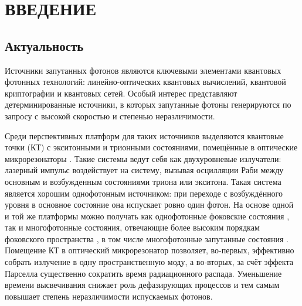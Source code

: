 \documentclass[11pt]{article}    %
\numberwithin{equation}{section}
\begin{document}
\setcounter{page}{2}

%
\tableofcontents
\restoregeometry %

\section*{ВВЕДЕНИЕ}
\subsection*{Актуальность}
Источники запутанных фотонов являются ключевыми элементами
квантовых фотонных технологий: линейно-оптических квантовых вычислений,
квантовой криптографии и квантовых сетей.
Особый интерес представляют детерминированные источники, в которых запутанные
фотоны генерируются по запросу с высокой скоростью и степенью неразличимости.

Среди перспективных платформ для таких источников выделяются
квантовые точки (КТ) с экситонными и трионными состояниями, помещённые в оптические
микрорезонаторы \cite{rakhlin2023}.
Такие системы ведут себя как двухуровневые излучатели: лазерный импульс
воздействует на систему,
вызывая осцилляции Раби между основным и возбужденным состояниями триона или экситона. %
Такая система является хорошим однофотонным источником:
при переходе с возбуждённого уровня в основное состояние она испускает ровно один фотон.
На основе одной и той же платформы можно получать как однофотонные фоковские
состояния \cite{senellart2017, tomm2021, rakhlin2023}, так и многофотонные
состояния, отвечающие более высоким порядкам фоковского пространства
\cite{fischer2017, fischer2018, loredo2019}, в том числе многофотонные
запутанные состояния \cite{tiurev2022, huet2025}.
Помещение КТ в оптический микрорезонатор позволяет, во-первых,
эффективно собрать излучение в одну пространственную моду, а во-вторых,
за счёт эффекта Парселла существенно сократить время радиационного распада.
Уменьшение времени высвечивания снижает роль дефазирующих процессов
и тем самым повышает степень неразличимости испускаемых фотонов.
\end{document}
